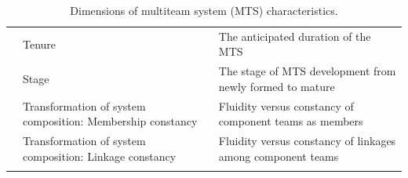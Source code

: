 \begin{center}
\begin{longtable}{ | p{2.5cm} | p{4cm} | p{8cm} | }
	& Tenure & The anticipated duration of the MTS \\ \cline{2-3}
	& Stage & The stage of MTS development from newly formed to mature \\ \cline{2-3}
	& Transformation of system composition: Membership constancy & Fluidity versus constancy of component teams as members \\ \cline{2-3}
	& Transformation of system composition: Linkage constancy & Fluidity versus constancy of linkages among component teams \\ \cline{2-3}
	\hline
\caption{Dimensions of multiteam system (MTS) characteristics.}
\label{domsc}
\end{longtable}
\end{center}